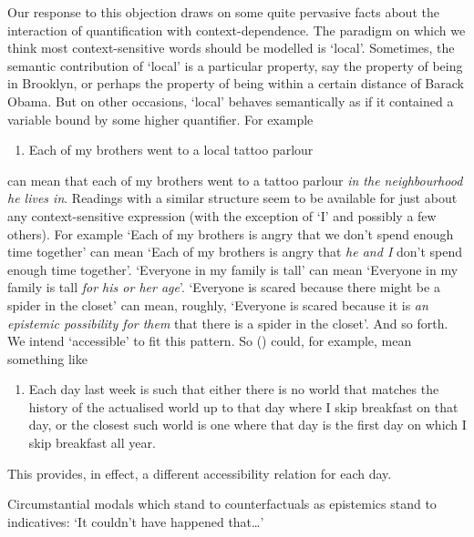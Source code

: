 Our response to this objection draws on some quite pervasive facts about
the interaction of quantification with context-dependence. The paradigm
on which we think most context-sensitive words should be modelled is
`local'. Sometimes, the semantic contribution of `local' is a particular
property, say the property of being in Brooklyn, or perhaps the property
of being within a certain distance of Barack Obama. But on other
occasions, `local' behaves semantically as if it contained a variable
bound by some higher quantifier. For example

\begin{enumerate}
\def\labelenumi{(\arabic{enumi})}
\setcounter{enumi}{73}
\itemsep1pt\parskip0pt
\item
  Each of my brothers went to a local tattoo parlour
\end{enumerate}

can mean that each of my brothers went to a tattoo parlour \emph{in the
neighbourhood he lives in}. Readings with a similar structure seem to be
available for just about any context-sensitive expression (with the
exception of `I' and possibly a few others). For example `Each of my
brothers is angry that we don't spend enough time together' can mean
`Each of my brothers is angry that \emph{he and I} don't spend enough
time together'. `Everyone in my family is tall' can mean `Everyone in my
family is tall \emph{for his or her age}'. `Everyone is scared because
there might be a spider in the closet' can mean, roughly, `Everyone is
scared because it is \emph{an epistemic possibility for them} that there
is a spider in the closet'. And so forth. We intend `accessible' to fit
this pattern. So () could, for example, mean something like

\begin{enumerate}
\def\labelenumi{(\arabic{enumi})}
\setcounter{enumi}{74}
\itemsep1pt\parskip0pt
\item
  Each day last week is such that either there is no world that matches
  the history of the actualised world up to that day where I skip
  breakfast on that day, or the closest such world is one where that day
  is the first day on which I skip breakfast all year.
\end{enumerate}

This provides, in effect, a different accessibility relation for each
day.

Circumstantial modals which stand to counterfactuals as epistemics stand
to indicatives: `It couldn't have happened that\ldots{}'

